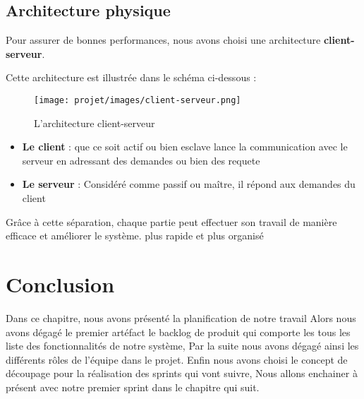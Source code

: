\subsection{Architecture physique}
Pour assurer de bonnes performances, nous avons choisi une architecture
\textbf{client-serveur}.

Cette architecture est illustrée dans le schéma ci-dessous :

\begin{figure}[H]
    \centering
    \texttt{[image: projet/images/client-serveur.png]}
    \caption{L’architecture client-serveur}
    \label{fig:equipe_scrum}
\end{figure}
\begin{itemize}
    \item \textbf{Le client} : que ce soit actif ou bien esclave lance la communication avec le serveur en adressant des demandes ou bien des requete
    \item \textbf{Le serveur} : Considéré comme passif ou maître, il répond aux demandes du client
    \end{itemize}

Grâce à cette séparation, chaque partie peut effectuer son travail de manière efficace et améliorer le système. plus rapide et plus organisé\\
\section*{Conclusion}
Dans ce chapitre, nous avons présenté la planification de notre travail Alors
nous avons dégagé le premier artéfact le backlog de produit qui comporte les tous les liste des fonctionnalités de notre système, Par la suite nous avons dégagé ainsi les différents rôles de l’équipe dans le projet. Enfin nous avons choisi le concept de découpage pour la réalisation des sprints qui vont suivre, Nous allons enchainer à présent avec notre premier sprint dans le
chapitre qui suit.
